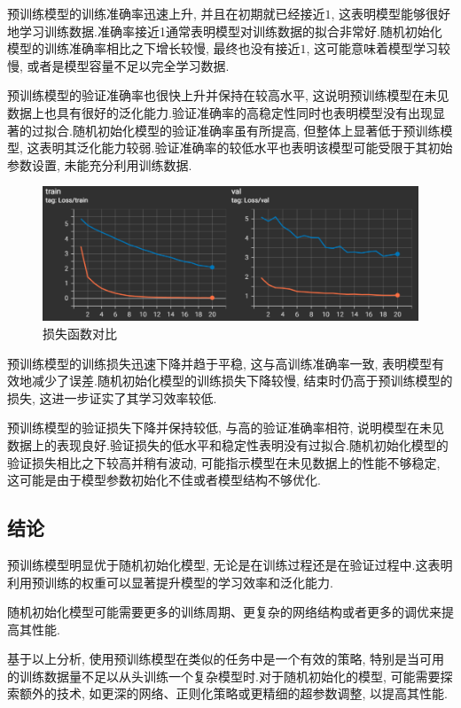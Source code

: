 \documentclass[notitlepage,cs4size,punct,oneside]{ctexrep}
\numberwithin{equation}{chapter}
\theoremstyle{mystyle}
\begin{document}
预训练模型的训练准确率迅速上升, 并且在初期就已经接近$1$, 这表明模型能够很好地学习训练数据.准确率接近1通常表明模型对训练数据的拟合非常好.随机初始化模型的训练准确率相比之下增长较慢, 最终也没有接近$1$, 这可能意味着模型学习较慢, 或者是模型容量不足以完全学习数据.

预训练模型的验证准确率也很快上升并保持在较高水平, 这说明预训练模型在未见数据上也具有很好的泛化能力.验证准确率的高稳定性同时也表明模型没有出现显著的过拟合.随机初始化模型的验证准确率虽有所提高, 但整体上显著低于预训练模型, 这表明其泛化能力较弱.验证准确率的较低水平也表明该模型可能受限于其初始参数设置, 未能充分利用训练数据.


\begin{figure}[H]
    \centering
    \includegraphics[scale=0.75]{loss.png}
    \caption{损失函数对比}
    \label{fig:loss}
\end{figure}

预训练模型的训练损失迅速下降并趋于平稳, 这与高训练准确率一致, 表明模型有效地减少了误差.随机初始化模型的训练损失下降较慢, 结束时仍高于预训练模型的损失, 这进一步证实了其学习效率较低.

预训练模型的验证损失下降并保持较低, 与高的验证准确率相符, 说明模型在未见数据上的表现良好.验证损失的低水平和稳定性表明没有过拟合.随机初始化模型的验证损失相比之下较高并稍有波动, 可能指示模型在未见数据上的性能不够稳定, 这可能是由于模型参数初始化不佳或者模型结构不够优化.

\subsection{结论}
预训练模型明显优于随机初始化模型, 无论是在训练过程还是在验证过程中.这表明利用预训练的权重可以显著提升模型的学习效率和泛化能力.

随机初始化模型可能需要更多的训练周期、更复杂的网络结构或者更多的调优来提高其性能.

基于以上分析, 使用预训练模型在类似的任务中是一个有效的策略, 特别是当可用的训练数据量不足以从头训练一个复杂模型时.对于随机初始化的模型, 可能需要探索额外的技术, 如更深的网络、正则化策略或更精细的超参数调整, 以提高其性能.
\end{document}
